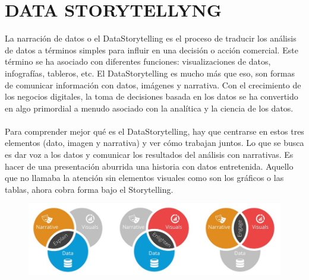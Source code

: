 \section{DATA STORYTELLYNG}
\item{La narración de datos o el DataStorytelling es el proceso de traducir los análisis de datos a términos simples para influir en una decisión o acción comercial. Este término se ha asociado con diferentes funciones: visualizaciones de datos, infografías, tableros, etc. El DataStorytelling es mucho más que eso, son formas de comunicar información con datos, imágenes y narrativa. Con el crecimiento de los negocios digitales, la toma de decisiones basada en los datos se ha convertido en algo primordial a menudo asociado con la analítica y la ciencia de los datos.\\\\
Para comprender mejor qué es el DataStorytelling, hay que centrarse en estos tres elementos (dato, imagen y narrativa) y ver cómo trabajan juntos. Lo que se busca es dar voz a los datos y comunicar los resultados del análisis con narrativas. Es hacer de una presentación aburrida una historia con datos entretenida. Aquello que no llamaba la atención sin elementos visuales como son los  gráficos o las tablas, ahora cobra forma bajo el Storytelling.}
\begin{figure}[htb]
\begin{center}
\includegraphics[width=15cm]{./Imagenes/imagen1}
\end{center}
\end{figure}

